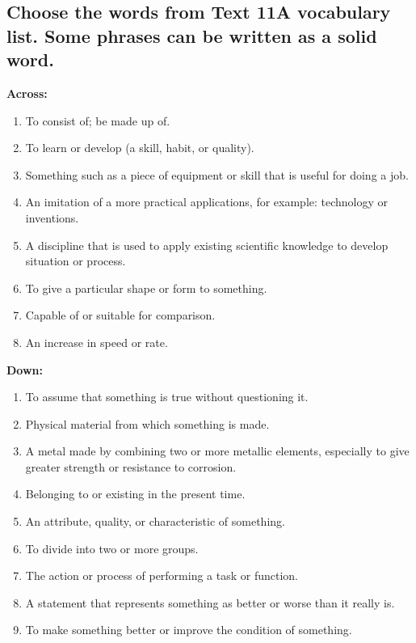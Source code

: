 \subsection*{Choose the words from Text 11A vocabulary list. Some phrases can be written as a solid word.}
\textbf{Across:}
\begin{enumerate}
      \item To consist of; be made up of.
      \item To learn or develop (a skill, habit, or quality).
      \item Something such as a piece of equipment or skill that is useful for doing a job.
      \item An imitation of a more practical applications, for example: technology or inventions.
      \item A discipline that is used to apply existing scientific knowledge to develop situation or process.
      \item To give a particular shape or form to something.
      \item Capable of or suitable for comparison.
      \item An increase in speed or rate.
\end{enumerate}

\textbf{Down:}
\begin{enumerate}
      \item To assume that something is true without questioning it.
      \item Physical material from which something is made.
      \item A metal made by combining two or more metallic elements, especially to give greater strength or resistance to corrosion.
      \item Belonging to or existing in the present time.
      \item An attribute, quality, or characteristic of something.
      \item To divide into two or more groups.
      \item The action or process of performing a task or function.
      \item A statement that represents something as better or worse than it really is.
      \item To make something better or improve the condition of something.
\end{enumerate}

